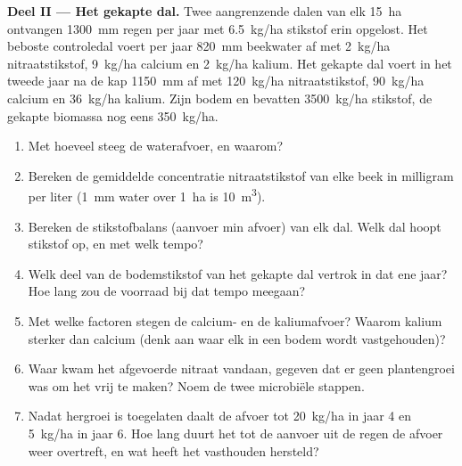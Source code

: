 \begin{problem}
\medskip
\noindent\textbf{Deel II --- Het gekapte dal.}
Twee aangrenzende dalen van elk \qty{15}{ha} ontvangen \qty{1300}{mm} regen
per jaar met \qty{6.5}{kg/ha} stikstof erin opgelost. Het beboste
controledal voert per jaar \qty{820}{mm} beekwater af met \qty{2}{kg/ha}
nitraatstikstof, \qty{9}{kg/ha} calcium en \qty{2}{kg/ha} kalium. Het
gekapte dal voert in het tweede jaar na de kap \qty{1150}{mm} af met
\qty{120}{kg/ha} nitraatstikstof, \qty{90}{kg/ha} calcium en \qty{36}{kg/ha}
kalium. Zijn bodem en  bevatten \qty{3500}{kg/ha} stikstof, de
gekapte biomassa nog eens \qty{350}{kg/ha}.
\begin{enumerate}[resume]
  \item Met hoeveel steeg de waterafvoer, en waarom?
  \item Bereken de gemiddelde concentratie nitraatstikstof van elke beek
        in milligram per liter (\qty{1}{mm} water over \qty{1}{ha} is
        \qty{10}{m^3}).
  \item Bereken de stikstofbalans (aanvoer min afvoer) van elk dal. Welk
        dal hoopt stikstof op, en met welk tempo?
  \item Welk deel van de bodemstikstof van het gekapte dal vertrok in dat
        ene jaar? Hoe lang zou de voorraad bij dat tempo meegaan?
  \item Met welke factoren stegen de calcium- en de kaliumafvoer? Waarom
        kalium sterker dan calcium (denk aan waar elk in een bodem wordt
        vastgehouden)?
  \item Waar kwam het afgevoerde nitraat vandaan, gegeven dat er geen
        plantengroei was om het vrij te maken? Noem de twee microbiële
        stappen.
  \item Nadat hergroei is toegelaten daalt de afvoer tot \qty{20}{kg/ha}
        in jaar 4 en \qty{5}{kg/ha} in jaar 6. Hoe lang duurt het tot de
        aanvoer uit de regen de afvoer weer overtreft, en wat heeft het
        vasthouden hersteld?
\end{enumerate}


\end{problem}
